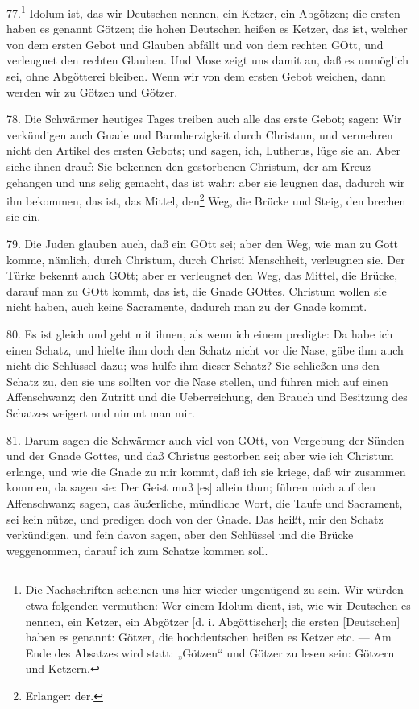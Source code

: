 77.\footnote{Die Nachschriften scheinen uns hier wieder ungenügend zu sein. Wir würden etwa folgenden vermuthen: Wer einem Idolum dient, ist, wie wir Deutschen es nennen, ein Ketzer, ein Abgötzer [d. i. Abgöttischer]; die ersten [Deutschen] haben es genannt: Götzer, die hochdeutschen heißen es Ketzer etc. — Am Ende des Absatzes wird statt: „Götzen“ und Götzer zu lesen sein: Götzern und Ketzern.} Idolum ist, das wir Deutschen nennen, ein Ketzer, ein Abgötzen; die ersten haben es genannt Götzen; die hohen Deutschen heißen es Ketzer, das ist, welcher von dem ersten Gebot und Glauben abfällt und von dem rechten GOtt, und verleugnet den rechten Glauben. Und Mose zeigt uns damit an, daß es unmöglich sei, ohne Abgötterei bleiben. Wenn wir von dem ersten Gebot weichen, dann werden wir zu Götzen und Götzer.

78. Die Schwärmer heutiges Tages treiben auch alle das erste Gebot; sagen: Wir verkündigen auch Gnade und Barmherzigkeit durch Christum, und vermehren nicht den Artikel des ersten Gebots; und sagen, ich, Lutherus, lüge sie an. Aber siehe ihnen drauf: Sie bekennen den gestorbenen Christum, der am Kreuz gehangen und uns selig gemacht, das ist wahr; aber sie leugnen das, dadurch wir ihn bekommen, das ist, das Mittel, den\footnote{Erlanger: der.} Weg, die Brücke und Steig, den brechen sie ein.

79. Die Juden glauben auch, daß ein GOtt sei; aber den Weg, wie man zu Gott komme, nämlich, durch Christum, durch Christi Menschheit, verleugnen sie. Der Türke bekennt auch GOtt; aber er verleugnet den Weg, das Mittel, die Brücke, darauf man zu GOtt kommt, das ist, die Gnade GOttes. Christum wollen sie nicht haben, auch keine Sacramente, dadurch man zu der Gnade kommt.

80. Es ist gleich und geht mit ihnen, als wenn ich einem predigte: Da habe ich einen Schatz, und hielte ihm doch den Schatz nicht vor die Nase, gäbe ihm auch nicht die Schlüssel dazu; was hülfe ihm dieser Schatz? Sie schließen uns den Schatz zu, den sie uns sollten vor die Nase stellen, und führen mich auf einen Affenschwanz; den Zutritt und die Ueberreichung, den Brauch und Besitzung des Schatzes weigert und nimmt man mir.

81. Darum sagen die Schwärmer auch viel von GOtt, von Vergebung der Sünden und der Gnade Gottes, und daß Christus gestorben sei; aber wie ich Christum erlange, und wie die Gnade zu mir kommt, daß ich sie kriege, daß wir zusammen kommen, da sagen sie: Der Geist muß [es] allein thun; führen mich auf den Affenschwanz; sagen, das äußerliche, mündliche Wort, die Taufe und Sacrament, sei kein nütze, und predigen doch von der Gnade. Das heißt, mir den Schatz verkündigen, und fein davon sagen, aber den Schlüssel und die Brücke weggenommen, darauf ich zum Schatze kommen soll.

